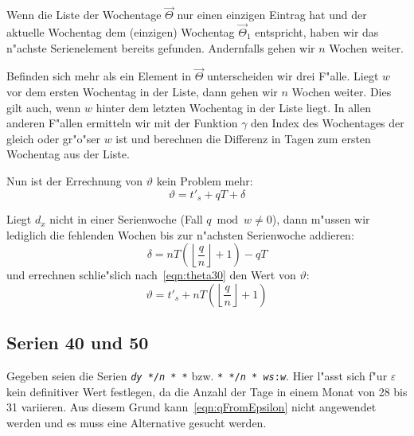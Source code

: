 \documentclass[a4paper]{article}
\numberwithin{equation}{section}
\begin{document}
\noindent Wenn die Liste der Wochentage $\vec{\Theta}$ nur einen einzigen
Eintrag hat und der aktuelle Wochentag dem (einzigen) Wochentag $\vec{\Theta}_1$
entspricht, haben wir das n"achste Serienelement bereits gefunden. Andernfalls
gehen wir $n$ Wochen weiter.

Befinden sich mehr als ein Element in $\vec{\Theta}$ unterscheiden wir drei
F"alle. Liegt $w$ vor dem ersten Wochentag in der Liste, dann gehen wir $n$
Wochen weiter. Dies gilt auch, wenn $w$ hinter dem letzten Wochentag in der
Liste liegt. In allen anderen F"allen ermitteln wir mit der Funktion $\gamma$
den Index des Wochentages der gleich oder gr"o"ser $w$ ist und berechnen die
Differenz in Tagen zum ersten Wochentag aus der Liste.

Nun ist der Errechnung von $\vartheta$ kein Problem mehr:
\begin{equation}\label{eqn:theta30}\vartheta = t'_s + qT + \delta\end{equation}

\noindent Liegt $d_x$ nicht in einer Serienwoche (Fall $q \bmod w \ne 0$), dann
m"ussen wir lediglich die fehlenden Wochen bis zur n"achsten Serienwoche
addieren:
\begin{equation}
  \delta = nT(\left\lfloor\frac{q}{n}\right\rfloor + 1) - qT
\end{equation}
und errechnen schlie"slich nach~\eqref{eqn:theta30} den Wert von $\vartheta$:
\begin{equation}
  \vartheta = t'_s + nT(\left\lfloor\frac{q}{n}\right\rfloor + 1)
\end{equation}


%
%
\subsection{Serien 40 und 50}\label{ssec:approx40_50}
Gegeben seien die Serien \texttt{\textit{dy} */\textit{n} * *} bzw.
\texttt{* */\textit{n} * \textit{ws}:\textit{w}}. Hier l"asst sich f"ur
$\varepsilon$ kein definitiver Wert festlegen, da die Anzahl der Tage in einem
Monat von 28 bis 31 variieren. Aus diesem Grund kann~\eqref{eqn:qFromEpsilon}
nicht angewendet werden und es muss eine Alternative gesucht werden.
\end{document}
